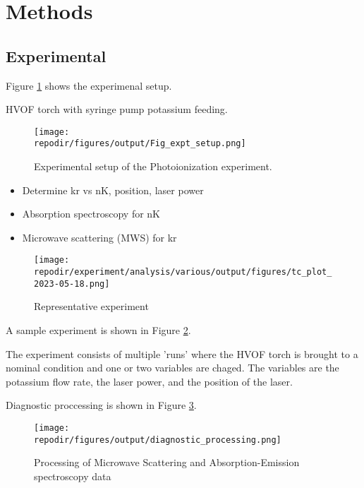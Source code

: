 \section{Methods}


\subsection{Experimental}

Figure \ref{fig:expt_setup} shows the experimenal setup. 

HVOF torch with syringe pump potassium feeding. 

\begin{figure}[h]
    \texttt{[image: \\repodir/figures/output/Fig\_expt\_setup.png]} 
    \caption{Experimental setup of the Photoionization experiment.}
    \label{fig:expt_setup}
\end{figure}

\begin{itemize}
\item Determine kr vs nK, position, laser power
\item Absorption spectroscopy for nK
\item Microwave scattering (MWS) for kr 
\end{itemize}


\begin{figure}[h]
    \texttt{[image: \\repodir/experiment/analysis/various/output/figures/tc\_plot\_2023-05-18.png]} 
    \caption{Representative experiment}
    \label{fig:expt_example}
\end{figure}

A sample experiment is shown in Figure \ref{fig:expt_example}.


The experiment consists of multiple 'runs' where the HVOF torch is brought to a nominal condition and one or two variables are chaged. The variables are the potassium flow rate, the laser power, and the position of the laser. 




Diagnostic proccessing is shown in Figure \ref{fig:diagnostic_processing}.

\begin{figure}[h]
    \texttt{[image: \\repodir/figures/output/diagnostic\_processing.png]} 
    \caption{Processing of Microwave Scattering and Absorption-Emission spectroscopy data}
    \label{fig:diagnostic_processing}
\end{figure}


